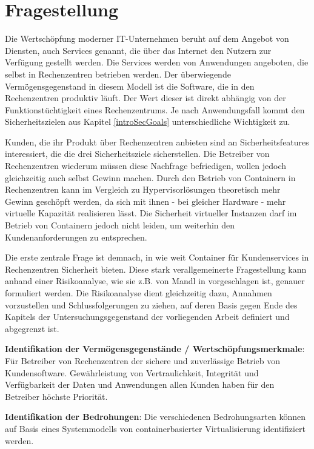 \documentclass[../main.tex]{subfiles}
\begin{document}
\chapter{Fragestellung}
\label{question}
  Die Wertschöpfung moderner IT-Unternehmen beruht auf dem Angebot von Diensten, auch Services genannt, die über das Internet den Nutzern zur Verfügung gestellt werden. Die Services werden von Anwendungen angeboten, die selbst in Rechenzentren betrieben werden. Der überwiegende Vermögensgegenstand in diesem Modell ist die Software, die in den Rechenzentren produktiv läuft. Der Wert dieser ist direkt abhängig von der Funktionstüchtigkeit eines Rechenzentrums. Je nach Anwendungsfall kommt den Sicherheitszielen aus Kapitel \ref{introSecGoals} unterschiedliche Wichtigkeit zu.

  Kunden, die ihr Produkt über Rechenzentren anbieten sind an Sicherheitsfeatures interessiert, die die drei Sicherheitsziele sicherstellen. Die Betreiber von Rechenzentren wiederum müssen diese Nachfrage befriedigen, wollen jedoch gleichzeitig auch selbst Gewinn machen. Durch den Betrieb von Containern in Rechenzentren kann im Vergleich zu Hypervisorlösungen theoretisch mehr Gewinn geschöpft werden, da sich mit ihnen - bei gleicher Hardware - mehr virtuelle Kapazität realisieren lässt. Die Sicherheit virtueller Instanzen darf im Betrieb von Containern jedoch nicht leiden, um weiterhin den Kundenanforderungen zu entsprechen.

  Die erste zentrale Frage ist demnach, in wie weit Container für Kundenservices in Rechenzentren Sicherheit bieten. Diese stark verallgemeinerte Fragestellung kann anhand einer Risikoanalyse, wie sie z.B. von Mandl in \cite[S.36]{CISSP} vorgeschlagen ist, genauer formuliert werden. Die Risikoanalyse dient gleichzeitig dazu, Annahmen vorzustellen und Schlussfolgerungen zu ziehen, auf deren Basis gegen Ende des Kapitels der Untersuchungsgegenstand der vorliegenden Arbeit definiert und abgegrenzt ist.

  \textbf{Identifikation der Vermögensgegenstände / Wertschöpfungsmerkmale}: Für Betreiber von Rechenzentren der sichere und zuverlässige Betrieb von Kundensoftware. Gewährleistung von Vertraulichkeit, Integrität und Verfügbarkeit der Daten und Anwendungen allen Kunden haben für den Betreiber höchste Priorität.

  \textbf{Identifikation der Bedrohungen}: Die verschiedenen Bedrohungsarten können auf Basis eines Systemmodells von containerbasierter Virtualisierung identifiziert werden.
\end{document}
